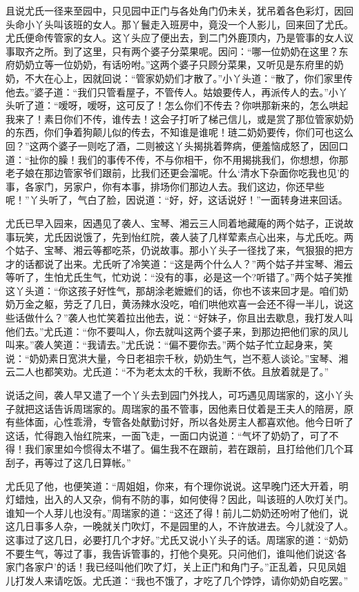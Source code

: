 \documentclass[12pt,oneside]{book}
\begin{document}
且说尤氏一径来至园中，只见园中正门与各处角门仍未关，犹吊着各色彩灯，因回头命小丫头叫该班的女人。那丫鬟走入班房中，竟没一个人影儿，回来回了尤氏。尤氏便命传管家的女人。这丫头应了便出去，到二门外鹿顶内，乃是管事的女人议事取齐之所。到了这里，只有两个婆子分菜果呢。因问：“哪一位奶奶在这里？东府奶奶立等一位奶奶，有话吩咐。”这两个婆子只顾分菜果，又听见是东府里的奶奶，不大在心上，因就回说：“管家奶奶们才散了。”小丫头道：“散了，你们家里传他去。”婆子道：“我们只管看屋子，不管传人。姑娘要传人，再派传人的去。”小丫头听了道：“嗳呀，嗳呀，这可反了！怎么你们不传去？你哄那新来的，怎么哄起我来了！素日你们不传，谁传去！这会子打听了梯己信儿，或是赏了那位管家奶奶的东西，你们争着狗颠儿似的传去，不知谁是谁呢！琏二奶奶要传，你们可也这么回？”这两个婆子一则吃了酒，二则被这丫头揭挑着弊病，便羞恼成怒了，因回口道：“扯你的臊！我们的事传不传，不与你相干，你不用揭挑我们，你想想，你那老子娘在那边管家爷们跟前，比我们还更会溜呢。什么‘清水下杂面你吃我也见’的事，各家门，另家户，你有本事，排场你们那边人去。我们这边，你还早些呢！”丫头听了，气白了脸，因说道：“好，好，这话说好！”一面转身进来回话。

尤氏已早入园来，因遇见了袭人、宝琴、湘云三人同着地藏庵的两个姑子，正说故事玩笑，尤氏因说饿了，先到怡红院，袭人装了几样荤素点心出来，与尤氏吃。两个姑子、宝琴、湘云等都吃茶，仍说故事。那小丫头子一径找了来，气狠狠的把方才的话都说了出来。尤氏听了冷笑道：“这是两个什么人？”两个姑子并宝琴、湘云等听了，生怕尤氏生气，忙劝说：“没有的事，必是这一个?听错了。”两个姑子笑推这丫头道：“你这孩子好性气，那胡涂老嬷嬷们的话，你也不该来回才是。咱们奶奶万金之躯，劳乏了几日，黄汤辣水没吃，咱们哄他欢喜一会还不得一半儿，说这些话做什么？”袭人也忙笑着拉出他去，说：“好妹子，你且出去歇息，我打发人叫他们去。”尤氏道：“你不要叫人，你去就叫这两个婆子来，到那边把他们家的凤儿叫来。”袭人笑道：“我请去。”尤氏说：“偏不要你去。”两个姑子忙立起身来，笑说：“奶奶素日宽洪大量，今日老祖宗千秋，奶奶生气，岂不惹人谈论。”宝琴、湘云二人也都笑劝。尤氏道：“不为老太太的千秋，我断不依。且放着就是了。”

说话之间，袭人早又遣了一个丫头去到园门外找人，可巧遇见周瑞家的，这小丫头子就把这话告诉周瑞家的。周瑞家的虽不管事，因他素日仗着是王夫人的陪房，原有些体面，心性乖滑，专管各处献勤讨好，所以各处房主人都喜欢他。他今日听了这话，忙得跑入怡红院来，一面飞走，一面口内说道：“气坏了奶奶了，可了不得！我们家里如今惯得太不堪了。偏生我不在跟前，若在跟前，且打给他们几个耳刮子，再等过了这几日算帐。”

尤氏见了他，也便笑道：“周姐姐，你来，有个理你说说。这早晚门还大开着，明灯蜡烛，出入的人又杂，倘有不防的事，如何使得？因此，叫该班的人吹灯关门。谁知一个人芽儿也没有。”周瑞家的道：“这还了得！前儿二奶奶还吩咐了他们，说这几日事多人杂，一晚就关门吹灯，不是园里的人，不许放进去。今儿就没了人。这事过了这几日，必要打几个才好。”尤氏又说小丫头子的话。周瑞家的道：“奶奶不要生气，等过了事，我告诉管事的，打他个臭死。只问他们，谁叫他们说这‘各家门各家户’的话！我已经叫他们吹了灯，关上正门和角门子。”正乱着，只见凤姐儿打发人来请吃饭。尤氏道：“我也不饿了，才吃了几个饽饽，请你奶奶自吃罢。”
\end{document}
